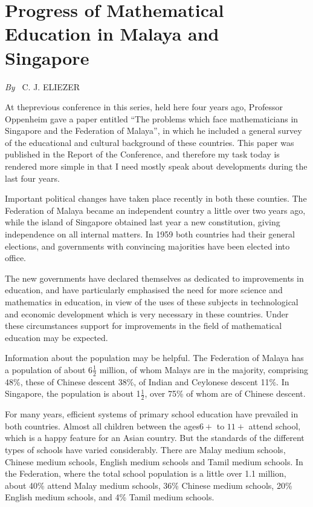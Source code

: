 
\chapter{Progress of Mathematical Education in Malaya and Singapore}

\begin{center}
{\em By~} C. J. ELIEZER
\end{center}

At the\pageoriginale previous conference in this series, held here
four years ago, Professor Oppenheim gave a paper entitled ``The
problems which face mathematicians in Singapore and the Federation of
Malaya'', in which he included a general survey of the educational and
cultural background of these countries. This paper was published in
the Report of the Conference, and therefore my task today is rendered
more simple in that I need mostly speak about developments during the
last four years. 

Important political changes have taken place recently in both these
counties.  The Federation of Malaya became an independent country a
little over two years ago, while the island of Singapore obtained last
year a new constitution, giving independence on all internal
matters. In 1959 both countries had their general elections, and
governments with convincing majorities have been elected into office.

The new governments have declared themselves as dedicated to
improvements in education, and have particularly emphasised the need
for more science and mathematics in education, in view of the uses of
these subjects in technological and economic development which is very
necessary in these countries. Under these circumstances support for
improvements in the field of mathematical education may be expected.

Information about the population may be helpful. The Federation of
Malaya has a population of about 6$\frac{1}{2}$ million, of whom
Malays are in the majority, comprising 48\%, these of Chinese descent
38\%, of Indian and Ceylonese descent 11\%. In Singapore, the
population is about 1$\frac{1}{2}$, over 75\% of whom are of Chinese descent.


For many years, efficient systems of primary school education have
prevailed in both countries. Almost all children between the
ages\pageoriginale $6+$ to $11+$ attend school, which is a happy
feature for an Asian country. But the standards of the different types
of schools have varied considerably. There are Malay medium schools,
Chinese medium schools, English medium schools and Tamil medium
schools. In the Federation, where the total school population is a
little over 1.1 million, about 40\% attend Malay medium schools, 36\%
Chinese medium schools, 20\% English medium schools, and 4\% Tamil
medium schools.

